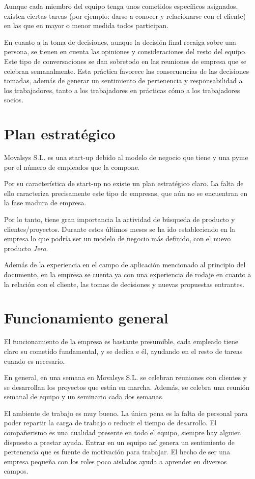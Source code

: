 	Aunque cada miembro del equipo tenga unos cometidos específicos asignados, existen ciertas tareas (por ejemplo: darse a conocer y relacionarse con el cliente) en las que en mayor o menor medida todos participan.
	
	En cuanto a la toma de decisiones, aunque la decisión final recaiga sobre una persona, se tienen en cuenta las opiniones y consideraciones del resto del equipo. Este tipo de conversaciones se dan sobretodo en las reuniones de empresa que se celebran semanalmente. Esta práctica favorece las consecuencias de las decisiones tomadas, además de generar un sentimiento de pertenencia y responsabilidad a los trabajadores, tanto a los trabajadores en prácticas cómo a los trabajadores socios. 

	\section{Plan estratégico}
	
	Movalsys S.L. es una start-up debido al modelo de negocio que tiene y una pyme por el número de empleados que la compone. 
	
	Por su característica de start-up no existe un plan estratégico claro. La falta de ello caracteriza precisamente este tipo de empresas, que aún no se encuentran en la fase madura de empresa.
	
	Por lo tanto, tiene gran importancia la actividad de búsqueda de producto y clientes/proyectos. Durante estos últimos meses se ha ido estableciendo en la empresa lo que podría ser un modelo de negocio más definido, con el nuevo producto \textit{Jero}.

	Además de la experiencia en el campo de aplicación mencionado al principio del documento, en la empresa se cuenta ya con una experiencia de rodaje en cuanto a la relación con el cliente, las tomas de decisiones y nuevas propuestas entrantes.

		
	
	\section{Funcionamiento general}
	
	El funcionamiento de la empresa es bastante presumible, cada empleado tiene claro su cometido fundamental, y se dedica e él, ayudando en el resto de tareas cuando es necesario. 
	
	En general, en una semana en Movalsys S.L. se celebran reuniones con clientes y se desarrollan los proyectos que están en marcha. Además, se celebra una reunión semanal de equipo y un seminario cada dos semanas.
	
	El ambiente de trabajo es muy bueno. La única pena es la falta de personal para poder repartir la carga de trabajo o reducir el tiempo de desarrollo. El compañerismo es una cualidad presente en todo el equipo, siempre hay alguien dispuesto a prestar ayuda. Entrar en un equipo así genera un sentimiento de pertenencia que es fuente de motivación para trabajar. El hecho de ser una empresa pequeña con los roles poco aislados ayuda a aprender en diversos campos.
	
	
	